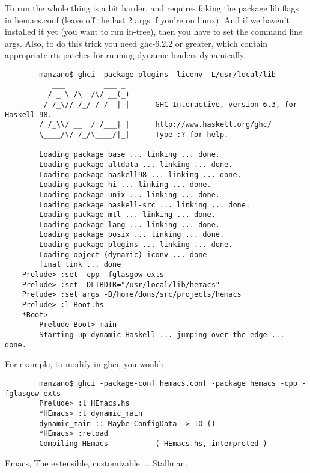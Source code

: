 To run the whole thing is a bit harder, and requires faking the
package lib flags in hemacs.conf (leave off the last 2 args if you're
on linux). And if we haven't installed it yet (you want to run
in-tree), then you have to set the command line args. Also, to do this
trick you need ghc-6.2.2 or greater, which contain appropriate rts
patches for running dynamic loaders dynamically.

\begin{verbatim}
        manzano$ ghci -package plugins -liconv -L/usr/local/lib
           ___         ___ _
          / _ \ /\  /\/ __(_)
         / /_\// /_/ / /  | |      GHC Interactive, version 6.3, for Haskell 98.
        / /_\\/ __  / /___| |      http://www.haskell.org/ghc/
        \____/\/ /_/\____/|_|      Type :? for help.

        Loading package base ... linking ... done.
        Loading package altdata ... linking ... done.
        Loading package haskell98 ... linking ... done.
        Loading package hi ... linking ... done.
        Loading package unix ... linking ... done.
        Loading package haskell-src ... linking ... done.
        Loading package mtl ... linking ... done.
        Loading package lang ... linking ... done.
        Loading package posix ... linking ... done.
        Loading package plugins ... linking ... done.
        Loading object (dynamic) iconv ... done
        final link ... done
	Prelude> :set -cpp -fglasgow-exts
	Prelude> :set -DLIBDIR="/usr/local/lib/hemacs"
	Prelude> :set args -B/home/dons/src/projects/hemacs
	Prelude> :l Boot.hs
	*Boot>
        Prelude Boot> main
        Starting up dynamic Haskell ... jumping over the edge ... done.
\end{verbatim}

For example, to modify  in ghci, you would:

\begin{verbatim}
        manzano$ ghci -package-conf hemacs.conf -package hemacs -cpp -fglasgow-exts
        Prelude> :l HEmacs.hs
        *HEmacs> :t dynamic_main
        dynamic_main :: Maybe ConfigData -> IO ()
        *HEmacs> :reload
        Compiling HEmacs           ( HEmacs.hs, interpreted )
\end{verbatim}

\begin{thebibliography}[50]
\bibitem Emacs, The extensible, customizable ... Stallman.
\end{thebibliography}
